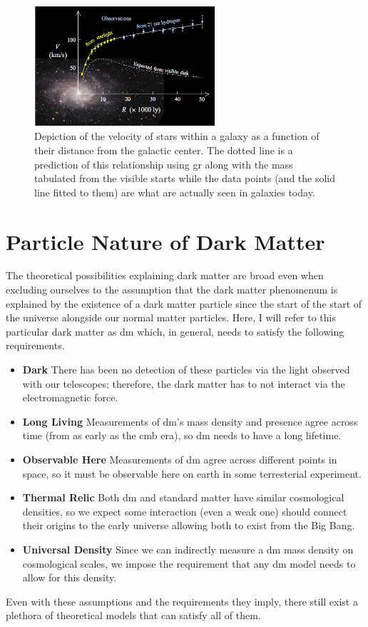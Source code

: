 \begin{figure}
  \centering
  \includegraphics[width=0.6\textwidth]{figures/theory/rotation-curve-evidence-for-dm.png}
  \caption{
    Depiction of the velocity of stars within a galaxy as a function of their distance
    from the galactic center. The dotted line is a prediction of this relationship using
    \gls{gr} along with the mass tabulated from the visible starts while the data points
    (and the solid line fitted to them) are what are actually seen in galaxies today.
  }
  \label{fig:rotation-curve}
\end{figure}

\section{Particle Nature of Dark Matter}
The theoretical possibilities explaining dark matter are broad \cite{darksectors-2016} even when
excluding ourselves to the assumption that the dark matter phenomenum is explained by the existence
of a dark matter particle since the start of the start of the universe alongside our normal matter
particles. Here, I will refer to this particular dark matter as \gls{dm} which, in general, needs
to satisfy the following requirements.
\begin{itemize}
  \item \textbf{Dark} There has been no detection of these particles via the light observed with our telescopes;
        therefore, the dark matter has to not interact via the electromagnetic force.
  \item \textbf{Long Living} Measurements of \gls{dm}'s mass density and presence agree across time
        (from as early as the \gls{cmb} era), so \gls{dm} needs to have a long lifetime.
  \item \textbf{Observable Here} Measurements of \gls{dm} agree across different points in space,
        so it must be observable here on earth in some terresterial experiment.
  \item \textbf{Thermal Relic} Both \gls{dm} and standard matter have similar
        cosmological densities, so we expect some interaction (even a weak one) should connect their
        origins to the early universe allowing both to exist from the Big Bang.
  \item \textbf{Universal Density} Since we can indirectly measure a \gls{dm} mass density on
        cosmological scales, we impose the requirement that any \gls{dm} model needs to allow for
        this density.
\end{itemize}
Even with these assumptions and the requirements they imply, there still exist a plethora of
theoretical models that can satisfy all of them.

